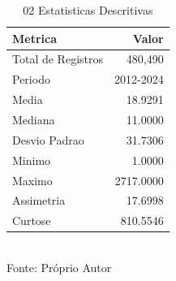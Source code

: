 \begin{table}[H]
\centering
\small
\caption{02 Estatisticas Descritivas}
\label{tab:02_02_Estatisticas_Descritivas}
\begin{tabular}{|l|r|}
\hline
\textbf{Metrica} & \textbf{Valor} \\
\hline
Total de Registros & 480,490 \\
Periodo & 2012-2024 \\
Media & 18.9291 \\
Mediana & 11.0000 \\
Desvio Padrao & 31.7306 \\
Minimo & 1.0000 \\
Maximo & 2717.0000 \\
Assimetria & 17.6998 \\
Curtose & 810.5546 \\
\hline
\end{tabular}
\\ \small Fonte: Próprio Autor
\end{table}
